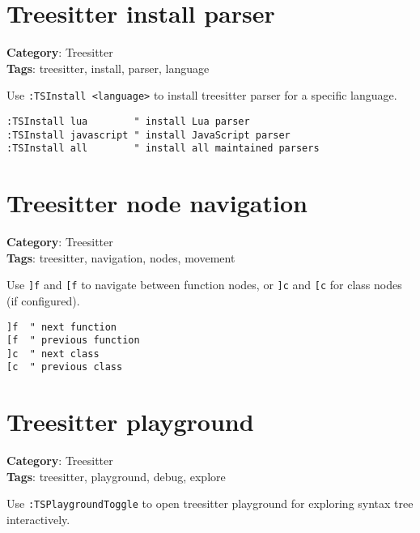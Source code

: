 {{{{{{{{{{{{{{{{{{\section{Treesitter install parser}

\textbf{Category}: Treesitter\\ \textbf{Tags}: treesitter, install, parser, language
\vspace{0.5cm}

Use {\footnotesize \Verb§:TSInstall <language>§} to install treesitter parser for a specific language.

\begin{Exa*}{}
\begin{Verbatim}[fontsize=\footnotesize, breaklines, breakanywhere]
:TSInstall lua        " install Lua parser
:TSInstall javascript " install JavaScript parser
:TSInstall all        " install all maintained parsers
\end{Verbatim}
\end{Exa*}

\section{Treesitter node navigation}

\textbf{Category}: Treesitter\\ \textbf{Tags}: treesitter, navigation, nodes, movement
\vspace{0.5cm}

Use {\footnotesize \Verb§]f§} and {\footnotesize \Verb§[f§} to navigate between function nodes, or {\footnotesize \Verb§]c§} and {\footnotesize \Verb§[c§} for class nodes (if configured).

\begin{Exa*}{}
\begin{Verbatim}[fontsize=\footnotesize, breaklines, breakanywhere]
]f  " next function
[f  " previous function
]c  " next class
[c  " previous class
\end{Verbatim}
\end{Exa*}

\section{Treesitter playground}

\textbf{Category}: Treesitter\\ \textbf{Tags}: treesitter, playground, debug, explore
\vspace{0.5cm}

Use {\footnotesize \Verb§:TSPlaygroundToggle§} to open treesitter playground for exploring syntax tree interactively.

}}}}}}}}}}}}}}}}}}

